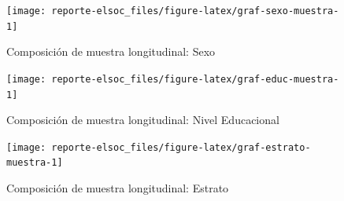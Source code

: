 \documentclass[
  12pt,
]{book}
\begin{document}
\begin{figure}

{\centering \texttt{[image: reporte-elsoc\_files/figure-latex/graf-sexo-muestra-1]} 

}

\caption{Composición de muestra longitudinal: Sexo}\label{fig:graf-sexo-muestra}
\end{figure}

\begin{figure}

{\centering \texttt{[image: reporte-elsoc\_files/figure-latex/graf-educ-muestra-1]} 

}

\caption{Composición de muestra longitudinal: Nivel Educacional}\label{fig:graf-educ-muestra}
\end{figure}

\begin{figure}

{\centering \texttt{[image: reporte-elsoc\_files/figure-latex/graf-estrato-muestra-1]} 

}

\caption{Composición de muestra longitudinal: Estrato}\label{fig:graf-estrato-muestra}
\end{figure}
\end{document}
